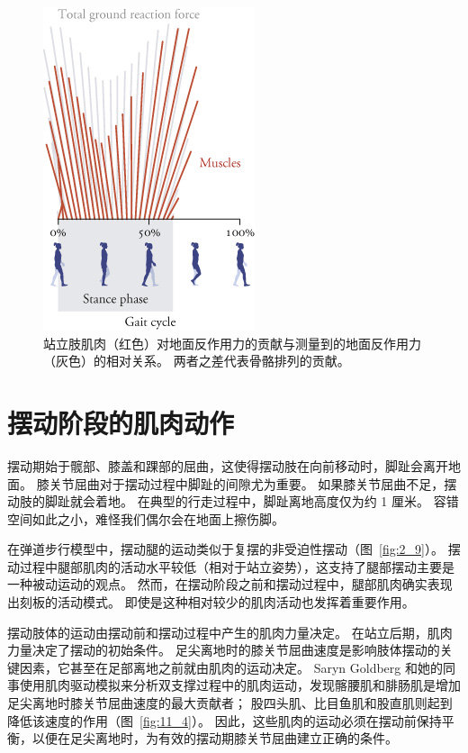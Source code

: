 \begin{figure}[!htb]
	\centering
	\includegraphics[width=0.4\linewidth]{chap11/11_3}
	\caption{站立肢肌肉（红色）对地面反作用力的贡献与测量到的地面反作用力（灰色）的相对关系。
		两者之差代表骨骼排列的贡献\cite{liu2008muscle}。 \label{fig:11_3}}
\end{figure}


\section{摆动阶段的肌肉动作}

摆动期始于髋部、膝盖和踝部的屈曲，这使得摆动肢在向前移动时，脚趾会离开地面。
膝关节屈曲对于摆动过程中脚趾的间隙尤为重要。
如果膝关节屈曲不足，摆动肢的脚趾就会着地。
在典型的行走过程中，脚趾离地高度仅为约 1 厘米。
容错空间如此之小，难怪我们偶尔会在地面上擦伤脚。


在弹道步行模型中，摆动腿的运动类似于复摆的非受迫性摆动（图~\ref{fig:2_9}）。
摆动过程中腿部肌肉的活动水平较低（相对于站立姿势），这支持了腿部摆动主要是一种被动运动的观点。
然而，在摆动阶段之前和摆动过程中，腿部肌肉确实表现出刻板的活动模式。
即使是这种相对较少的肌肉活动也发挥着重要作用。


摆动肢体的运动由摆动前和摆动过程中产生的肌肉力量决定。
在站立后期，肌肉力量决定了摆动的初始条件。
足尖离地时的膝关节屈曲速度是影响肢体摆动的关键因素，它甚至在足部离地之前就由肌肉的运动决定。
Saryn Goldberg 和她的同事使用肌肉驱动模拟来分析双支撑过程中的肌肉运动，发现髂腰肌和腓肠肌是增加足尖离地时膝关节屈曲速度的最大贡献者；
股四头肌、比目鱼肌和股直肌则起到降低该速度的作用（图~\ref{fig:11_4}）。
因此，这些肌肉的运动必须在摆动前保持平衡，以便在足尖离地时，为有效的摆动期膝关节屈曲建立正确的条件。


